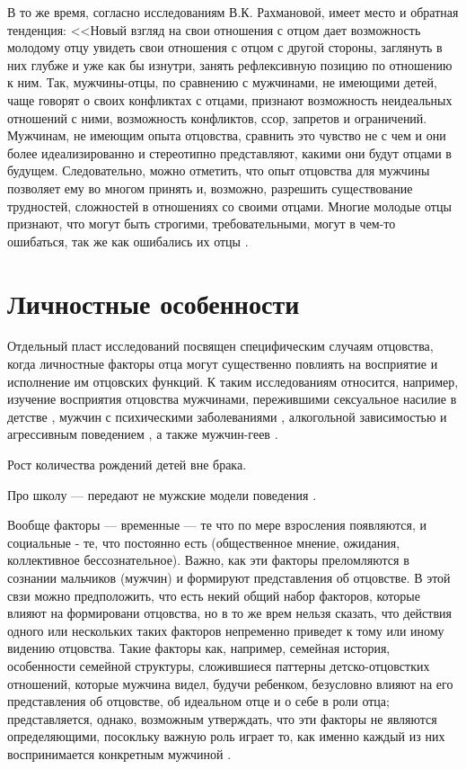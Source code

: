 \documentclass{../../common/thesisbyxetex}
\begin{document}
В то же время, согласно исследованиям В.К. Рахмановой, имеет место и обратная тенденция: <<Новый 
взгляд на свои отношения с отцом дает возможность молодому отцу увидеть свои отношения с отцом с 
другой стороны, заглянуть в них глубже и уже как бы изнутри, занять рефлексивную позицию по 
отношению 
к ним. Так, мужчины-отцы, по сравнению с мужчинами, не имеющими детей, чаще говорят о своих 
конфликтах с отцами, признают возможность неидеальных отношений с ними, возможность конфликтов, 
ссор, запретов и ограничений. Мужчинам, не имеющим опыта отцовства, сравнить это чувство не с чем и 
они более идеализированно и стереотипно представляют, какими они будут отцами в будущем. 
Следовательно, можно отметить, что опыт отцовства для мужчины позволяет ему во многом принять и, 
возможно, разрешить существование трудностей, сложностей в отношениях со своими отцами. Многие 
молодые отцы признают, что могут быть строгими, требовательными, могут в чем-то ошибаться, так же 
как 
ошибались их отцы \cite[54]{relot}.

\section{Личностные особенности} 

Отдельный пласт исследований посвящен специфическим случаям отцовства, когда личностные факторы 
отца могут существенно повлиять на восприятие и исполнение им отцовских функций. К таким 
исследованиям относится, например, изучение восприятия отцовства мужчинами, пережившими сексуальное 
насилие в детстве \cite{sex}, мужчин с психическими заболеваниями \cite{gbi}, алкогольной 
зависимостью и агрессивным поведением \cite{alc}, а также мужчин-геев \cite{gay}.

Рост количества рождений детей вне брака.

Про школу --- передают не мужские модели поведения \cite{md}.


Вообще факторы --- временные --- те что по мере взросления появляются, и социальные - те, что 
постоянно есть (общественное мнение, ожидания, коллективное бессознательное). Важно, как эти 
факторы преломляются в сознании мальчиков (мужчин) и формируют представления об отцовстве. В этой 
свзи можно предположить, что есть некий общий набор факторов, которые влияют на формировани 
отцовства, но в то же врем нельзя сказать, что действия одного или нескольких таких факторов 
непременно приведет к тому или иному видению отцовства. Такие факторы как, например, семейная 
история, особенности семейной структуры, сложившиеся паттерны детско-отцовстких отношений, 
которые мужчина видел, будучи ребенком, безусловно влияют на его представления об отцовстве, об 
идеальном отце и о себе в роли отца; представляется, однако, возможным утверждать, что эти 
факторы не являются определяющими, посокльку важную роль играет то, как именно каждый из них 
воспринимается конкретным мужчиной \cite[164]{long}. 
\end{document}
